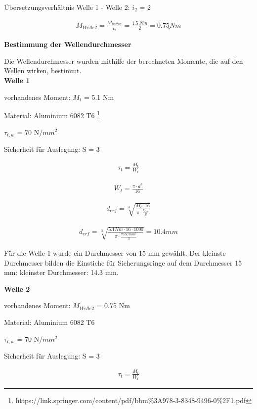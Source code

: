 Übersetzungsverhältnis Welle 1 - Welle 2: $i_{2}$ = 2

\begin{align*}
M_{Welle 2} = \frac{M_{halten}}{i_{2}} = \frac{1.5\ Nm}{2} = \underline{\underline{0.75 Nm}}
\end{align*}

\newpage

\textbf{Bestimmung der Wellendurchmesser}

Die Wellendurchmesser wurden mithilfe der berechneten Momente, die auf den Wellen wirken, bestimmt.\\

\textbf{Welle 1}

vorhandenes Moment: $M_{t}$ = 5.1 Nm

Material: Aluminium 6082 T6 \footnote{https://link.springer.com/content/pdf/bbm\%3A978-3-8348-9496-0\%2F1.pdf}

$\tau_{t,w}$ = 70 N/$mm^{2}$

Sicherheit für Auslegung: S = 3

\begin{align*}
\tau_{t} = \frac{M_{t}}{W_{t}}
\end{align*}

\begin{align*}
W_{t} = \frac{\pi \cdot d^{3}}{16}
\end{align*}

\begin{align*}
d_{erf} = \sqrt[3]{\frac{M_{t} \cdot 16}{\pi \cdot \frac{\tau_{t,w}}{S}}} 
\end{align*}

\begin{align*}
d_{erf} = \sqrt[3]{\frac{5.1 Nm \cdot 16 \cdot 1000}{\pi \cdot \frac{70 N/mm^{2}}{3}}} = 10.4 mm
\end{align*}

Für die Welle 1 wurde ein Durchmesser von 15 mm gewählt. Der kleinste Durchmesser bilden die Einstiche für Sicherungsringe auf dem Durchmesser 15 mm: kleinster Durchmesser: 14.3 mm.



\newpage

\textbf{Welle 2}

vorhandenes Moment: $M_{Welle 2}$ = 0.75 Nm

Material: Aluminium 6082 T6 

$\tau_{t,w}$ = 70 N/$mm^{2}$

Sicherheit für Auslegung: S = 3

\begin{align*}
\tau_{t} = \frac{M_{t}}{W_{t}}
\end{align*}

